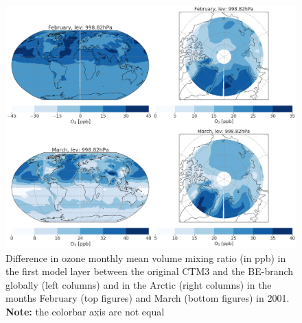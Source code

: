 \begin{figure}[h]
    \centering
    \includegraphics[width = \linewidth]{Chapter6_Results/images/BE_origPD_vmr_FebMarch.png}
    \caption{Difference in ozone monthly mean volume mixing ratio (in ppb) in the first model layer between the original CTM3 and the BE-branch globally (left columns) and in the Arctic (right columns) in the months February (top figures) and March (bottom figures) in 2001. \textbf{Note:} the colorbar axis are not equal}
    \label{fig:BE_origPD_vmr_FebMarch}
\end{figure}
